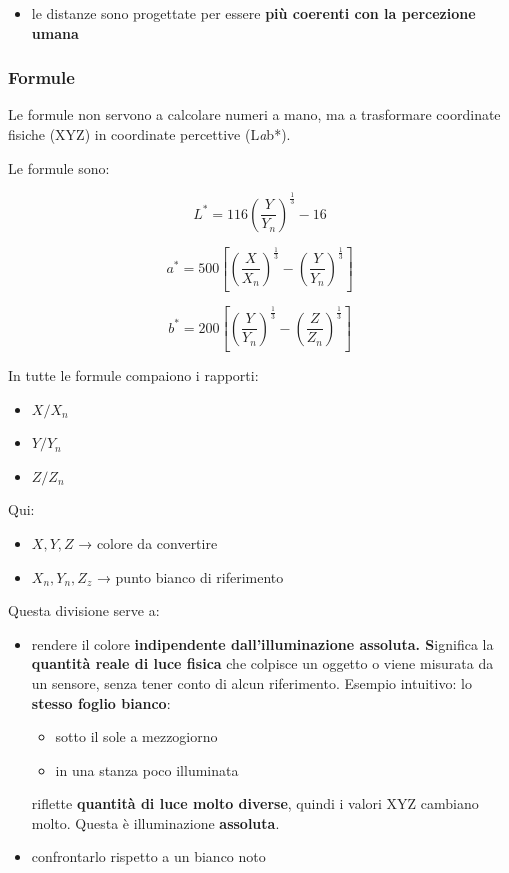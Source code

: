 \documentclass[
]{article}
\providecommand{\tightlist}{%
  \setlength{\itemsep}{0pt}\setlength{\parskip}{0pt}}
\begin{document}
\begin{itemize}
\tightlist
\item
  le distanze sono progettate per essere \textbf{più coerenti con la percezione umana}
\end{itemize}

\hypertarget{formule}{%
\subsubsection{Formule}\label{formule}}

Le formule non servono a calcolare numeri a mano, ma a trasformare coordinate fisiche (XYZ) in coordinate percettive (L\emph{a}b*).

Le formule sono:

\[
L^* = 116 \left( \frac{Y}{Y_n} \right)^{\frac{1}{3}} - 16
\]

\[
a^* = 500 \left[ \left( \frac{X}{X_n} \right)^{\frac{1}{3}} - \left( \frac{Y}{Y_n} \right)^{\frac{1}{3}} \right]
\]

\[
b^* = 200 \left[ \left( \frac{Y}{Y_n} \right)^{\frac{1}{3}} - \left( \frac{Z}{Z_n} \right)^{\frac{1}{3}} \right]
\]

In tutte le formule compaiono i rapporti:

\begin{itemize}
\tightlist
\item
  \(X/X_n\)
\item
  \(Y/Y_n\)
\item
  \(Z/Z_n\)
\end{itemize}

Qui:

\begin{itemize}
\tightlist
\item
  \(X, Y, Z\) → colore da convertire
\item
  \(X_n, Y_n, Z_z\) → punto bianco di riferimento
\end{itemize}

Questa divisione serve a:

\begin{itemize}
\item
  rendere il colore \textbf{indipendente dall'illuminazione assoluta. S}ignifica la \textbf{quantità reale di luce fisica} che colpisce un oggetto o viene misurata da un sensore, senza tener conto di alcun riferimento.
  Esempio intuitivo:
  lo \textbf{stesso foglio bianco}:

  \begin{itemize}
  \tightlist
  \item
    sotto il sole a mezzogiorno
  \item
    in una stanza poco illuminata
  \end{itemize}

  riflette \textbf{quantità di luce molto diverse}, quindi i valori XYZ cambiano molto.
  Questa è illuminazione \textbf{assoluta}.
\item
  confrontarlo rispetto a un bianco noto
\end{itemize}
\end{document}
